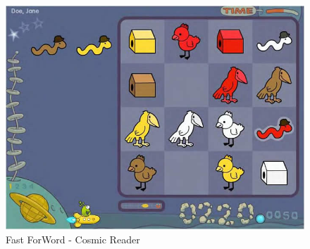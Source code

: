 \begin{figure}[!h]
    \centering
    \includegraphics[scale = .4]{Chapters/related_work_img/FastForWord_Cosmic_Reader.jpg}
    \caption{Fast ForWord - Cosmic Reader}
    \label{fig:fastforword}
\end{figure}


